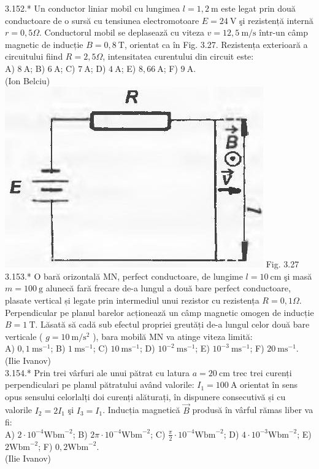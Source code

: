 3.152.* Un conductor liniar mobil cu lungimea $l=1,2 \mathrm{~m}$ este legat prin două conductoare de o sursă cu tensiunea electromotoare $E=24 \mathrm{~V}$ şi rezistență internă $r=0,5 \Omega$. Conductorul mobil se deplasează cu viteza $v=12,5 \mathrm{~m} / \mathrm{s}$ într-un câmp magnetic de inducție $B=0,8 \mathrm{~T}$, orientat ca în Fig. 3.27. Rezistența exterioară a circuitului fiind $R=2,5 \Omega$, intensitatea curentului din circuit este:\\ A) $8 \mathrm{~A}$; B) $6 \mathrm{~A}$; C) $7 \mathrm{~A}$; D) $4 \mathrm{~A}$; E) $8,66 \mathrm{~A}$; F) $9 \mathrm{~A}$.\\ (Ion Belciu)\\ \includegraphics[width=0.4\linewidth]{images/2025_07_01_5b3ff9fa0d508c8e9f17g-177} Fig. 3.27\\

3.153.* O bară orizontală MN, perfect conductoare, de lungime $l=10 \mathrm{~cm}$ şi masă $m=100 \mathrm{~g}$ alunecă fară frecare de-a lungul a două bare perfect conductoare, plasate vertical și legate prin intermediul unui rezistor cu rezistența $R=0,1 \Omega$. Perpendicular pe planul barelor acționează un câmp magnetic omogen de inducție $B=1 \mathrm{~T}$. Lăsată să cadă sub efectul propriei greutăți de-a lungul celor două bare verticale ( $g=10 \mathrm{~m} / \mathrm{s}^{2}$ ), bara mobilă MN va atinge viteza limită:\\ A) $0,1 \mathrm{~ms}^{-1}$; B) $1 \mathrm{~ms}^{-1}$; C) $10 \mathrm{~ms}^{-1}$; D) $10^{-2} \mathrm{~ms}^{-1}$; E) $10^{-3} \mathrm{~ms}^{-1}$; F) $20 \mathrm{~ms}^{-1}$.\\ (Ilie Ivanov)\\

3.154.* Prin trei vârfuri ale unui pătrat cu latura $a=20 \mathrm{~cm}$ trec trei curenți perpendiculari pe planul pătratului având valorile: $I_{1}=100 \mathrm{~A}$ orientat în sens opus sensului celorlalți doi curenți alăturați, în dispunere consecutivă și cu valorile $I_{2}=2 I_{1}$ şi $I_{3}=I_{1}$. Inducția magnetică $\vec{B}$ produsă în vârful rămas liber va fi:\\ A) $2 \cdot 10^{-4} \mathrm{Wbm}^{-2}$; B) $2 \pi \cdot 10^{-4} \mathrm{Wbm}^{-2}$; C) $\frac{\pi}{2} \cdot 10^{-4} \mathrm{Wbm}^{-2}$; D) $4 \cdot 10^{-3} \mathrm{Wbm}^{-2}$; E) $2 \mathrm{Wbm}^{-2}$; F) $0,2 \mathrm{Wbm}^{-2}$.\\ (Ilie Ivanov)\\

